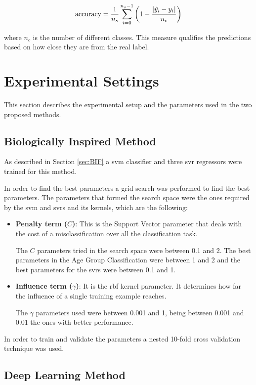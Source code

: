 \begin{equation}
\text{accuracy} = \frac{1}{n_s}\sum_{i=0}^{n_s-1} \bigg{(} 1-\frac{|\hat{y_i}-y_i|}{n_c}\bigg{)}
\end{equation}

where $n_c$ is the number of different classes. This measure qualifies the predictions based on how close they are from the real label. 

\section{Experimental Settings}
This section describes the experimental setup and the parameters used in the two proposed methods.

\subsection{Biologically Inspired Method}

As described in Section \ref{sec:BIF} a \gls{svm} classifier and three \gls{svr} regressors were trained for this method. 

In order to find the best parameters a grid search was performed to find the best parameters. The parameters that formed the search space were the ones required by the \gls{svm} and \glspl{svr} and its kernels, which are the following:

\begin{itemize}
	\item \textbf{Penalty term ($C$)}: This is the Support Vector parameter that deals with the cost of a misclassification over all the classification task. 
	
	The $C$ parameters tried in the search space were between 0.1 and 2. The best parameters in the Age Group Classification were between 1 and 2 and the best parameters for the \glspl{svr} were between 0.1 and 1.
	
	\item \textbf{Influence term ($\gamma$)}: It is the \gls{rbf} kernel parameter. It determines how far the influence of a single training example reaches.
	
	The $\gamma$ parameters used were between 0.001 and 1, being between 0.001 and 0.01 the ones with better performance.
\end{itemize}

In order to train and validate the parameters a nested 10-fold cross validation technique was used.

\subsection{Deep Learning Method}

